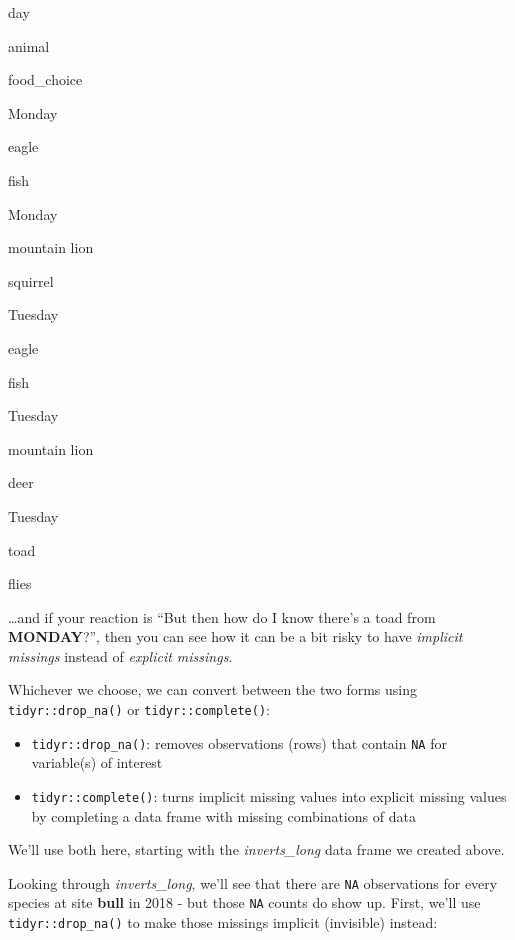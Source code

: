 \documentclass[]{book}
\newenvironment{Shaded}{\begin{snugshade}}{\end{snugshade}}
\newcommand{\KeywordTok}[1]{\textcolor[rgb]{0.13,0.29,0.53}{\textbf{#1}}}
\newcommand{\NormalTok}[1]{#1}
\newcommand{\OperatorTok}[1]{\textcolor[rgb]{0.81,0.36,0.00}{\textbf{#1}}}
\newcommand{\StringTok}[1]{\textcolor[rgb]{0.31,0.60,0.02}{#1}}
\providecommand{\tightlist}{%
  \setlength{\itemsep}{0pt}\setlength{\parskip}{0pt}}
\begin{document}
day

animal

food\_choice

Monday

eagle

fish

Monday

mountain lion

squirrel

Tuesday

eagle

fish

Tuesday

mountain lion

deer

Tuesday

toad

flies

\ldots{}and if your reaction is ``But then how do I know there's a toad from \textbf{MONDAY}?'', then you can see how it can be a bit risky to have \emph{implicit missings} instead of \emph{explicit missings}.

Whichever we choose, we can convert between the two forms using \texttt{tidyr::drop\_na()} or \texttt{tidyr::complete()}:

\begin{itemize}
\tightlist
\item
  \texttt{tidyr::drop\_na()}: removes observations (rows) that contain \texttt{NA} for variable(s) of interest
\item
  \texttt{tidyr::complete()}: turns implicit missing values into explicit missing values by completing a data frame with missing combinations of data
\end{itemize}

We'll use both here, starting with the \emph{inverts\_long} data frame we created above.

Looking through \emph{inverts\_long}, we'll see that there are \texttt{NA} observations for every species at site \textbf{bull} in 2018 - but those \texttt{NA} counts do show up. First, we'll use \texttt{tidyr::drop\_na()} to make those missings implicit (invisible) instead:

\begin{Shaded}
\end{Shaded}
\end{document}
